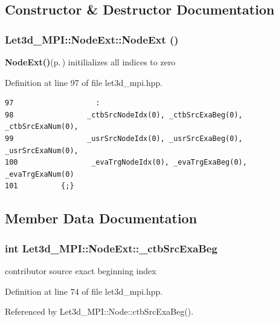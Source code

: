 \subsection{Constructor \& Destructor Documentation}
\subsubsection{\setlength{\rightskip}{0pt plus 5cm}Let3d\_\-MPI::Node\-Ext::Node\-Ext ()\hspace{0.3cm}{\tt  [inline]}}\label{classLet3d__MPI_1_1NodeExt_c0f80386fdfa6d2ef85f373b6c73c145_c0f80386fdfa6d2ef85f373b6c73c145}


{\bf Node\-Ext()}{\rm (p.\,\pageref{classLet3d__MPI_1_1NodeExt_c0f80386fdfa6d2ef85f373b6c73c145_c0f80386fdfa6d2ef85f373b6c73c145})} initilializes all indices to zero 

Definition at line 97 of file let3d\_\-mpi.hpp.

\footnotesize\begin{verbatim}97                   : 
98                 _ctbSrcNodeIdx(0), _ctbSrcExaBeg(0), _ctbSrcExaNum(0),
99                 _usrSrcNodeIdx(0), _usrSrcExaBeg(0), _usrSrcExaNum(0),
100                 _evaTrgNodeIdx(0), _evaTrgExaBeg(0), _evaTrgExaNum(0)
101          {;}
\end{verbatim}\normalsize 




\subsection{Member Data Documentation}
\subsubsection{\setlength{\rightskip}{0pt plus 5cm}int {\bf Let3d\_\-MPI::Node\-Ext::\_\-ctb\-Src\-Exa\-Beg}}\label{classLet3d__MPI_1_1NodeExt_0855bd3cbee08562d9cd22b53aefacf1_0855bd3cbee08562d9cd22b53aefacf1}


contributor source exact beginning index 

Definition at line 74 of file let3d\_\-mpi.hpp.

Referenced by Let3d\_\-MPI::Node::ctb\-Src\-Exa\-Beg().
